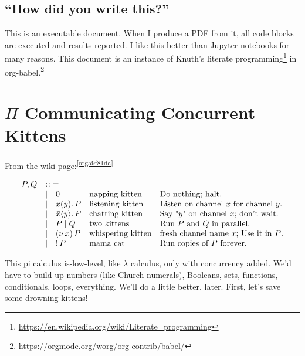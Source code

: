 \documentclass[10pt,oneside,x11names]{article}
\newcommand{\Coloneqq}{\mathrel{\vcenter{\hbox{$:\,:\,=$}}{}}}
\newcommand\napping    [0]{0}
\newcommand\chatting   [3]{\bar{#1}\langle{#2}\rangle{}.\,#3}
\newcommand\listening  [3]{#1(#2).\,#3}
\newcommand\two        [2]{#1\mathrel{\vert}{#2}}
\newcommand\whispering [2]{(\nu\,#1)\,{#2}}
\newcommand\mama       [1]{!\,{#1}}
\theoremstyle{definition}
\theoremstyle{warning}
\begin{document}
\subsection{``How did you write this?''}
\label{sec:org9d1704f}

This is an executable document. When I produce a PDF from it, all
code blocks are executed and results reported. I like this better
than Jupyter notebooks for many reasons. This document
is an instance of Knuth's literate programming\footnote{\url{https://en.wikipedia.org/wiki/Literate\_programming}}
in org-babel.\footnote{\url{https://orgmode.org/worg/org-contrib/babel/}}

\newpage
\section{\(\Pi\) Communicating Concurrent Kittens}
\label{sec:org38f366c}

From the wiki page:\textsuperscript{\ref{orga9f81da}}

\begin{equation}
\begin{array}{clll}
  P, Q & \Coloneqq \\
       & | \quad \napping            & \textrm{napping kitten}    & \textrm{Do nothing; halt.}                                    \\
       & | \quad \listening{x}{y}{P} & \textrm{listening kitten}  & \textrm{Listen on channel }x\textrm{ for channel }y\textrm{.} \\
       & | \quad \chatting{x}{y}{P}  & \textrm{chatting kitten}   & \textrm{Say "}y\textrm{" on channel }x\textrm{; don't wait.}  \\
       & | \quad \two{P}{Q}          & \textrm{two kittens}       & \textrm{Run }P\textrm{ and }Q\textrm{ in parallel.}           \\
       & | \quad \whispering{x}{P}   & \textrm{whispering kitten} & \textrm{fresh channel name }x\textrm{; Use it in }P\textrm{.} \\
       & | \quad \mama{P}            & \textrm{mama cat}          & \textrm{Run copies of }P\textrm{ forever.} \\
\end{array}
\end{equation}

This pi calculus is-low-level, like \(\lambda\) calculus, only with
concurrency added. We'd have to build up numbers (like Church
numerals), Booleans, sets, functions, conditionals, loops,
everything. We'll do a little better, later. First, let's save
some drowning kittens!
\end{document}
